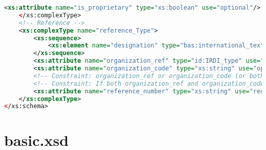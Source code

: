 \begin{lstlisting}[caption=catalogue.xsd, language=XML, label=lst:catalogue_xsd]
		<xs:attribute name="is_proprietary" type="xs:boolean" use="optional"/>
	</xs:complexType>
	<!-- Reference -->
	<xs:complexType name="reference_Type">
		<xs:sequence>
			<xs:element name="designation" type="bas:international_text_Type" minOccurs="0"/>
		</xs:sequence>
		<xs:attribute name="organization_ref" type="id:IRDI_type" use="optional"/>
		<xs:attribute name="organization_code" type="xs:string" use="optional"/>
		<!-- Constraint: organization_ref or organization_code (or both) must be specified. -->
		<!-- Constraint: If both organization_ref and organization_code are specified, they must denote the same organization. -->
		<xs:attribute name="reference_number" type="xs:string" use="required"/>
	</xs:complexType>
</xs:schema>

 \end{lstlisting} 
 
 \section{basic.xsd}

